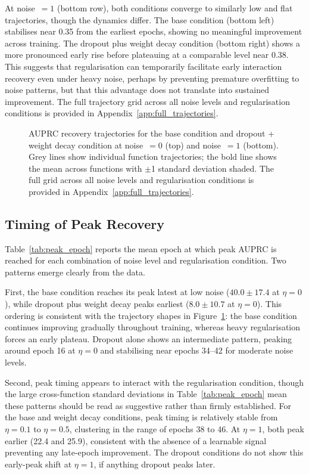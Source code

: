 \documentclass{article}
\begin{document}
At noise~$= 1$ (bottom row), both conditions converge to similarly low and flat
trajectories, though the dynamics differ. The base condition (bottom left)
stabilises near 0.35 from the earliest epochs, showing no meaningful improvement
across training. The dropout plus weight decay condition (bottom right) shows a
more pronounced early rise before plateauing at a comparable level near 0.38.
This suggests that regularisation can temporarily facilitate early interaction
recovery even under heavy noise, perhaps by preventing premature overfitting to
noise patterns, but that this advantage does not translate into sustained
improvement. The full trajectory grid across all noise levels and regularisation
conditions is provided in Appendix~\ref{app:full_trajectories}.

\begin{figure}[htbp]
    \centering
    
    \caption{AUPRC recovery trajectories for the base condition and
    dropout + weight decay condition at noise~$= 0$ (top) and noise~$= 1$ (bottom).
    Grey lines show individual function trajectories; the bold line shows the mean
    across functions with $\pm$1 standard deviation shaded. The full grid across
    all noise levels and regularisation conditions is provided in
    Appendix~\ref{app:full_trajectories}.}
    \label{fig:trajectory_highlight}
\end{figure}


\FloatBarrier
\subsection{Timing of Peak Recovery}

Table~\ref{tab:peak_epoch} reports the mean epoch at which peak AUPRC is reached
for each combination of noise level and regularisation condition. Two patterns
emerge clearly from the data.

First, the base condition reaches its peak latest at low noise ($40.0 \pm 17.4$
at $\eta = 0$), while dropout plus weight decay peaks earliest ($8.0 \pm 10.7$
at $\eta = 0$). This ordering is consistent with the trajectory shapes in
Figure~\ref{fig:trajectory_highlight}: the base condition continues improving
gradually throughout training, whereas heavy regularisation forces an early
plateau. Dropout alone shows an intermediate pattern, peaking around epoch 16
at $\eta = 0$ and stabilising near epochs 34--42 for moderate noise levels.


Second, peak timing appears to interact with the regularisation condition,
though the large cross-function standard deviations in Table~\ref{tab:peak_epoch} mean these patterns should be read as suggestive rather than firmly established.
For the base and weight decay conditions, peak timing is relatively stable from $\eta = 0.1$
to $\eta = 0.5$, clustering in the range of epochs 38 to 46. At $\eta = 1$,
both peak earlier (22.4 and 25.9), consistent with the absence of a learnable signal preventing any late-epoch improvement.
The dropout conditions do not show this early-peak shift at $\eta = 1$, if anything dropout peaks later.
\end{document}
